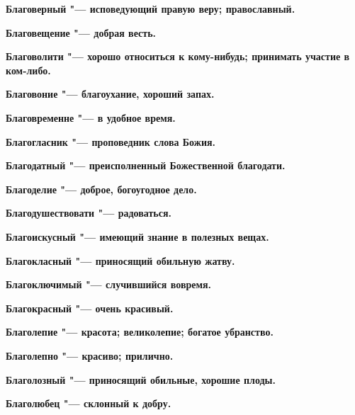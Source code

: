 \begin{mymulticols}{2}
\bfseries Благоверный\normalfont{} "--- исповедующий правую веру; православный. 




\bfseries Благовещение\normalfont{} "--- добрая весть. 




\bfseries Благоволити\normalfont{} "--- хорошо относиться к кому-нибудь; принимать участие в ком-либо. 




\bfseries Благовоние\normalfont{} "--- благоухание, хороший запах. 




\bfseries Благовременне\normalfont{} "--- в удобное время. 




\bfseries Благогласник\normalfont{} "--- проповедник слова Божия. 




\bfseries Благодатный\normalfont{} "--- преисполненный Божественной благодати. 




\bfseries Благоделие\normalfont{} "--- доброе, богоугодное дело. 




\bfseries Благодушествовати\normalfont{} "--- радоваться. 




\bfseries Благоискусный\normalfont{} "--- имеющий знание в полезных вещах. 




\bfseries Благокласный\normalfont{} "--- приносящий обильную жатву. 




\bfseries Благоключимый\normalfont{} "--- случившийся вовремя. 




\bfseries Благокрасный\normalfont{} "--- очень красивый. 




\bfseries Благолепие\normalfont{} "--- красота; великолепие; богатое убранство. 




\bfseries Благолепно\normalfont{} "--- красиво; прилично. 




\bfseries Благолозный\normalfont{} "--- приносящий обильные, хорошие плоды. 




\bfseries Благолюбец\normalfont{} "--- склонный к добру. 





\end{mymulticols}
